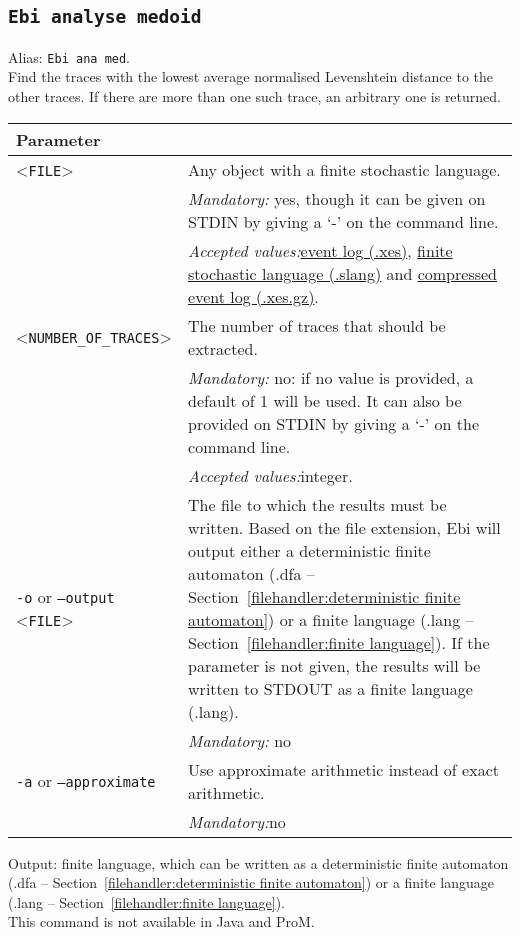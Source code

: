 {\subsection{\texttt{Ebi analyse medoid}}
\label{command:Ebi analyse medoid}
Alias: \texttt{Ebi ana med}.\\
Find the traces with the lowest average normalised Levenshtein distance to the other traces.
If there are more than one such trace, an arbitrary one is returned.\\
\begin{tabularx}{\linewidth}{lX}
\toprule
Parameter \\\midrule
<\texttt{FILE}>&Any object with a finite stochastic language.\\
&\textit{Mandatory:} \quad yes, though it can be given on STDIN by giving a `-' on the command line.\\
&\textit{Accepted values:}\quad \hyperref[filehandler:event log]{event log (.xes)}, \hyperref[filehandler:finite stochastic language]{finite stochastic language (.slang)} and \hyperref[filehandler:compressed event log]{compressed event log (.xes.gz)}.\\
<\texttt{NUMBER\_OF\_TRACES}>&The number of traces that should be extracted.\\
&\textit{Mandatory:} \quad no: if no value is provided, a default of 1 will be used. It can also be provided on STDIN by giving a `-' on the command line.\\
&\textit{Accepted values:}\quad integer.\\
\texttt{-o} or \texttt{--output} <\texttt{FILE}> &
The file to which the results must be written. Based on the file extension, Ebi will output either a deterministic finite automaton (.dfa -- Section~\ref{filehandler:deterministic finite automaton}) or a finite language (.lang -- Section~\ref{filehandler:finite language}).
If the parameter is not given, the results will be written to STDOUT as a finite language (.lang).\\
&\textit{Mandatory:} \quad no\\
\texttt{-a} or \texttt{--approximate} & Use approximate arithmetic instead of exact arithmetic.\\
&\textit{Mandatory:}\quad no\\
\bottomrule
\end{tabularx}
\noindent Output: finite language, which can be written as a deterministic finite automaton (.dfa -- Section~\ref{filehandler:deterministic finite automaton}) or a finite language (.lang -- Section~\ref{filehandler:finite language}).
\\This command is not available in Java and ProM.
}
